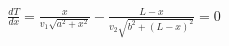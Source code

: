 \documentclass[preview]{standalone}
\begin{document}
\begin{align*}
\frac{dT}{dx} = \frac{x}{v_1\sqrt{a^2+x^2}} - \frac{L-x}{v_2\sqrt{b^2+(L-x)^2}} = 0
\end{align*}
\end{document}
